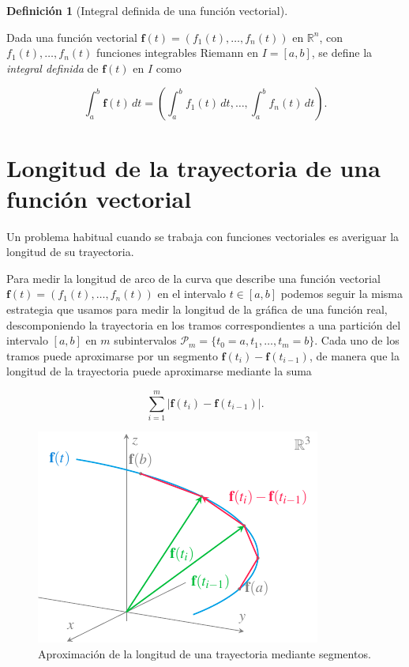 \documentclass[
  a4paper,
]{scrreport}
\theoremstyle{definition}
\theoremstyle{plain}
\theoremstyle{definition}
\newtheorem{definition}{Definición}[chapter]
\theoremstyle{definition}
\theoremstyle{plain}
\theoremstyle{plain}
\theoremstyle{remark}
\begin{document}
\begin{definition}[Integral definida de una función
vectorial]\protect\hypertarget{def-integral-definida-funcion-vectorial}{}\label{def-integral-definida-funcion-vectorial}

Dada una función vectorial \(\mathbf{f}(t)=(f_1(t),\ldots, f_n(t))\) en
\(\mathbb{R}^n\), con \(f_1(t),\ldots,f_n(t)\) funciones integrables
Riemann en \(I=[a,b]\), se define la \emph{integral definida} de
\(\mathbf{f}(t)\) en \(I\) como

\[
\int_a^b \mathbf{f}(t)\, dt = \left(\int_a^b f_1(t)\, dt, \ldots, \int_a^b f_n(t)\,dt\right).
\]

\end{definition}

\section{Longitud de la trayectoria de una función
vectorial}\label{longitud-de-la-trayectoria-de-una-funciuxf3n-vectorial}

Un problema habitual cuando se trabaja con funciones vectoriales es
averiguar la longitud de su trayectoria.

Para medir la longitud de arco de la curva que describe una función
vectorial \(\mathbf{f}(t)=(f_1(t),\ldots,f_n(t))\) en el intervalo
\(t\in[a,b]\) podemos seguir la misma estrategia que usamos para medir
la longitud de la gráfica de una función real, descomponiendo la
trayectoria en los tramos correspondientes a una partición del intervalo
\([a,b]\) en \(m\) subintervalos
\(\mathcal{P}_m = \{t_0=a, t_1, \ldots, t_m=b\}\). Cada uno de los
tramos puede aproximarse por un segmento
\(\mathbf{f}(t_i)-\mathbf{f}(t_{i-1})\), de manera que la longitud de la
trayectoria puede aproximarse mediante la suma

\[
\sum_{i=1}^m |\mathbf{f}(t_i)-\mathbf{f}(t_{i-1})|.
\]

\begin{figure}[H]

{\centering \includegraphics{img/funciones-vectoriales/longitud-trayectoria-funcion-vectorial.pdf}

}

\caption{Aproximación de la longitud de una trayectoria mediante
segmentos.}

\end{figure}%
\end{document}
